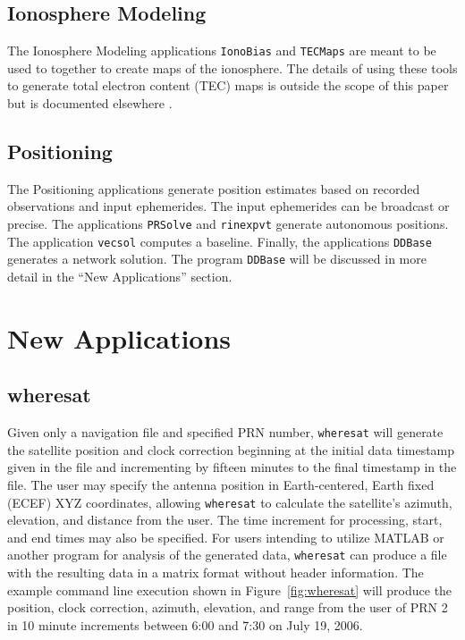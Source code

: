 \documentclass{ion-gps}
\newcommand{\gpstkapplication}[1]{\texttt{#1}}
\begin{document}
\subsection*{Ionosphere Modeling}
The Ionosphere Modeling applications \gpstkapplication{IonoBias} 
and \gpstkapplication{TECMaps} are meant to be used to together 
to create maps of the ionosphere. The details of using these 
tools to generate total electron content (TEC) maps is outside 
the scope of this paper but is documented elsewhere \cite{beacon04}.

\subsection*{Positioning}
The Positioning applications generate position estimates based on 
recorded observations and input ephemerides. The input ephemerides 
can be broadcast or precise. The applications \gpstkapplication{PRSolve} 
and \gpstkapplication{rinexpvt} generate autonomous positions. 
The application \gpstkapplication{vecsol} computes a baseline. 
Finally, the applications \gpstkapplication{DDBase} generates a 
network solution. The program \gpstkapplication{DDBase} will be 
discussed in more detail in the ``New Applications'' section.



\section*{New Applications}

\subsection*{wheresat}

Given only a navigation file and specified PRN number,
\gpstkapplication{wheresat} will generate the satellite position and
clock correction beginning at the initial data timestamp given in the
file and incrementing by fifteen minutes to the final timestamp in
the file. The user may specify the antenna position in Earth-centered,
Earth fixed (ECEF) XYZ coordinates, allowing
\gpstkapplication{wheresat} to calculate the satellite's azimuth,
elevation, and distance from the user.  The time increment for
processing, start, and end times may also be specified.  For users
intending to utilize MATLAB\cite{matlabsite} or another program for analysis of the
generated data, \gpstkapplication{wheresat} can produce a file with
the resulting data in a matrix format without header information.  The
example command line execution shown in Figure~\ref{fig:wheresat} will
produce the position, clock correction, azimuth, elevation, and range
from the user of PRN 2 in 10 minute increments between 6:00 and 7:30
on July 19, 2006.
\end{document}
